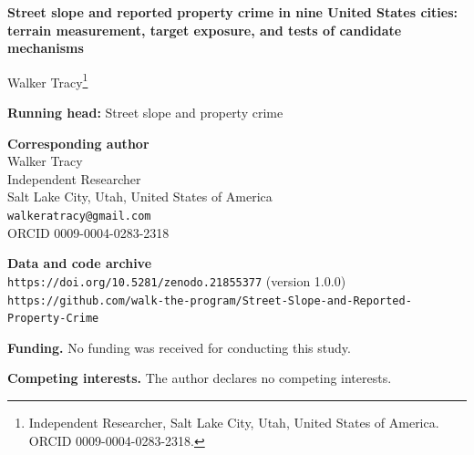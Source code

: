 \documentclass[12pt,letterpaper]{article}
\begin{document}
\begin{flushleft}
{\Large\bfseries Street slope and reported property crime in nine United States cities:\\[4pt] terrain measurement, target exposure, and tests of candidate mechanisms}

\vspace{20pt}
Walker Tracy\footnote{Independent Researcher, Salt Lake City, Utah, United States
of America. ORCID 0009-0004-0283-2318.}

\vspace{16pt}
\textbf{Running head:} Street slope and property crime

\vspace{16pt}
\textbf{Corresponding author}\\
Walker Tracy\\
Independent Researcher\\
Salt Lake City, Utah, United States of America\\
\texttt{walkeratracy@gmail.com}\\
ORCID 0009-0004-0283-2318

\vspace{16pt}
\textbf{Data and code archive}\\
\texttt{https://doi.org/10.5281/zenodo.21855377} (version 1.0.0)\\
\texttt{https://github.com/walk-the-program/Street-Slope-and-Reported-Property-Crime}

\vspace{16pt}
\textbf{Funding.} No funding was received for conducting this study.

\textbf{Competing interests.} The author declares no competing interests.
\end{flushleft}
\end{document}
